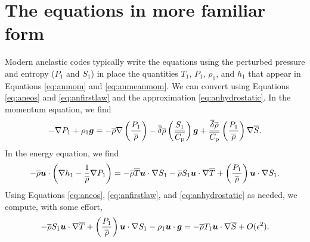 \documentclass[12pt]{article}
\newcommand{\deltaref}{\overline{\delta}}
\newcommand{\cpref}{\overline{\cpcap}}
\begin{document}
\section{The \citet{Gough1969} equations in more familiar form}
Modern anelastic codes typically write the equations using the perturbed pressure and entropy ($P_1$ and $S_1$) in place the quantities $T_1$, $P_1$, $\rho_1$, and $h_1$ that appear in Equations \eqref{eq:anmom} and \eqref{eq:anmeanmom}. We can convert using Equations \eqref{eq:aneos} and \eqref{eq:anfirstlaw} and the approximation \eqref{eq:anhydrostatic}. In the momentum equation, we find
\begin{align}\label{eq:anrhsmom}
	-\nabla P_1 + \rho_1\vecg = -\rhoref\nabla\left(\frac{P_1}{\rhoref}\right) - \deltaref \rhoref \left(\frac{S_1}{\cpref}\right) \vecg + \frac{\deltaref\rhoref}{\cpref} \left(\frac{P_1}{\rhoref}\right)\nabla\sref.
\end{align}
In the energy equation, we find
\begin{align}\label{eq:anrhsen}
	-\overline{\rho}\bm{u}\cdot\left(\nabla h_1-\frac{1}{\overline{\rho}}\nabla P_1\right) = -\overline{\rho}\overline{T}\bm{u}\cdot\nabla S_1 - \overline{\rho} S_1\bm{u}\cdot\nabla\overline{T} + \left(\frac{P_1}{\overline{\rho}}\right)\bm{u}\cdot\nabla S_1.
\end{align}
Using Equations \eqref{eq:aneos}, \eqref{eq:anfirstlaw}, and \eqref{eq:anhydrostatic} as needed, we compute, with some effort,
\begin{align}\label{eq:anrhsen2}
	- \overline{\rho} S_1\bm{u}\cdot\nabla\overline{T} + \left(\frac{P_1}{\overline{\rho}}\right)\bm{u}\cdot\nabla S_1 -\rho_1\bm{u}\cdot\bm{g} = -\overline{\rho} T_1\bm{u}\cdot\nabla\overline{S} + O(\epsilon^2).
\end{align}
\end{document}
